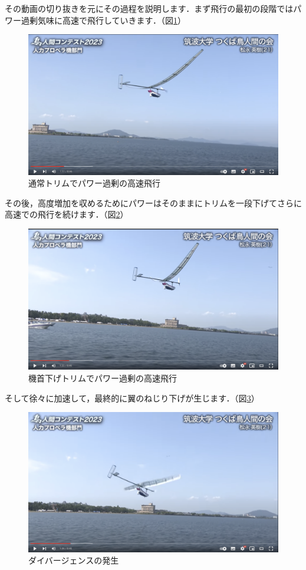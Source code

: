 \documentclass{jarticle}
\begin{document}
その動画の切り抜きを元にその過程を説明します．まず飛行の最初の段階ではパワー過剰気味に高速で飛行していきます．（図\ref{tsukuba1}）
\begin{figure}[H]
    \centering
    \includegraphics[width=0.7\linewidth]{image/tsukuba0111.png}
    \caption{通常トリムでパワー過剰の高速飛行}
    \label{tsukuba1}
\end{figure}
その後，高度増加を収めるためにパワーはそのままにトリムを一段下げてさらに高速での飛行を続けます．（図\ref{tsukuba2}）
\begin{figure}[H]
    \centering
    \includegraphics[width=0.7\linewidth]{image/tsukuba0122.png}
    \caption{機首下げトリムでパワー過剰の高速飛行}
    \label{tsukuba2}
\end{figure}
そして徐々に加速して，最終的に翼のねじり下げが生じます．（図\ref{tsukuba3}）
\begin{figure}[H]
    \centering
    \includegraphics[width=0.7\linewidth]{image/tsukuba0126.png}
    \caption{ダイバージェンスの発生}
    \label{tsukuba3}
\end{figure}
\end{document}

